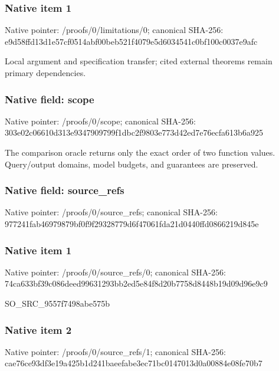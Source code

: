 \documentclass[10pt,a4paper]{article}
\begin{document}
\subsubsection{Native item 1}


Native pointer: /proofs/0/limitations/0; canonical SHA-256: e9d58ffd13d1e57cf0514abf\allowbreak{}00beb521f4079e5d6034541c\allowbreak{}0bf100c0037e9afc


Local argument and specification transfer; cited external theorems remain primary dependencies.


\subsubsection{Native field: scope}


Native pointer: /proofs/0/scope; canonical SHA-256: 303e02c06610d313e9347909\allowbreak{}799f1dbc2f9803e773d42ed7\allowbreak{}e76ecfa613b6a925


The comparison oracle returns only the exact order of two function values. Query/output domains, model budgets, and guarantees are preserved.


\subsubsection{Native field: source\_refs}


Native pointer: /proofs/0/source\_refs; canonical SHA-256: 977241fab46979879bf0f9f2\allowbreak{}9328779d6f47061fda21d044\allowbreak{}0ffd0866219d845e



\subsubsection{Native item 1}


Native pointer: /proofs/0/source\_refs/0; canonical SHA-256: 74ca633bf39c086deed99631\allowbreak{}293bb2ed5e84f8d20b7758d8\allowbreak{}448b19d09d96e9c9


SO\_SRC\_9557f7498abe575b


\subsubsection{Native item 2}


Native pointer: /proofs/0/source\_refs/1; canonical SHA-256: cae76ce93df3e19a425b1d24\allowbreak{}1baeefabe3ec71bc0147013d\allowbreak{}0a00884e08fe70b7
\end{document}
